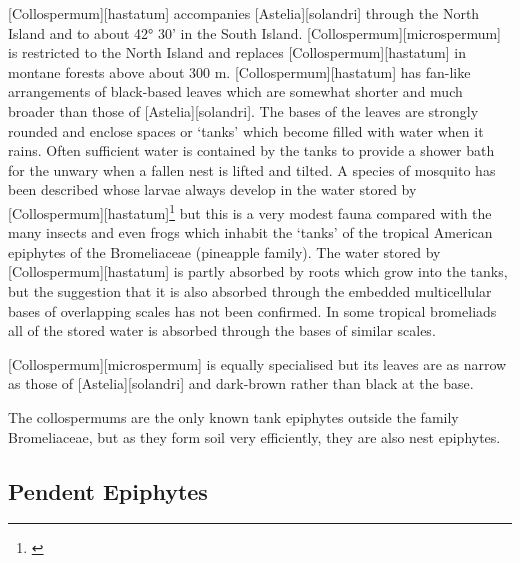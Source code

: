 [Collospermum][hastatum] accompanies [Astelia][solandri] through the North Island and to about 42° 30' in the South Island. [Collospermum][microspermum] is restricted to the North Island and replaces [Collospermum][hastatum] in montane forests above about 300 m. [Collospermum][hastatum] has fan-like arrangements of black-based leaves which are somewhat shorter and much broader than those of [Astelia][solandri].
The bases of the leaves are strongly rounded and enclose spaces or `tanks' which become filled with water when it rains.
Often sufficient water is contained by the tanks to provide a shower bath for the unwary when a fallen  nest is lifted and tilted.
A species of mosquito has been described whose larvae always develop in the water stored by [Collospermum][hastatum]\footnote{\cite{belkin1968mosquito}} but this is a very modest fauna compared with the many insects and even frogs which inhabit the `tanks' of the tropical American epiphytes of the Bromeliaceae (pineapple family).
The water stored by [Collospermum][hastatum] is partly absorbed by roots which grow into the tanks, but the suggestion that it is also absorbed through the embedded multicellular bases of overlapping scales has not been confirmed.
In some tropical bromeliads all of the stored water is absorbed through the bases of similar scales.

[Collospermum][microspermum] is equally specialised but its leaves are as narrow as those of [Astelia][solandri] and dark-brown rather than black at the base.

The collospermums are the only known tank epiphytes outside the family Bromeliaceae, but as they form soil very efficiently, they are also nest epiphytes.

\subsection{Pendent Epiphytes}


